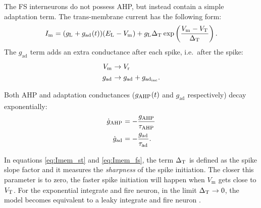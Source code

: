 \documentclass[a4paper,12pt]{article}
\newcommand{\ssc}[3]{\ensuremath{#1_{\text{#2}_{\text{#3}}}}}
\newcommand{\Vm}       {\ssc{V}      {m}     {}}
\newcommand{\Imem}     {\ssc{I}      {m}     {}}
\newcommand{\gL}       {\ssc{g}      {\scriptsize{L}}  {}}
\newcommand{\EL}       {\ssc{E}      {\scriptsize{L}}  {}}
\newcommand{\gAHP}     {\ssc{g}      {\scriptsize{AHP}}{}}
\newcommand{\tauAHP}   {\ssc{\tau}   {\scriptsize{AHP}}{}}
\newcommand{\VT}       {\ssc{V}      {\scriptsize{T}}  {}}
\newcommand{\Vr}       {\ssc{V}      {r}     {}}
\newcommand{\gad}      {\ssc{g}      {ad}{}}
\newcommand{\tauad}    {\ssc{\tau}   {ad}{}}
\newcommand{\gadinc}   {\ssc{g}      {ad}{inc}}
\newcommand{\deltaT}   {\ssc{\Delta} {\scriptsize{T}}{}}
\newcommand{\dgAHP}  {\ssc{\dot{g}}{\scriptsize{AHP}} {}}
\newcommand{\dgad}   {\ssc{\dot{g}}{\scriptsize{ad}}  {}}
\begin{document}
The FS interneurons do not possess AHP, but instead contain a simple adaptation
term. The trans-membrane current has the following form:
\begin{equation}
    \Imem = (\gL + \gad(t))(\EL-\Vm) + \gL \deltaT \exp\left(\frac{\Vm - \VT}{\deltaT}\right).
    \label{eq:Imem_fs}
\end{equation}
The $\gad$ term adds an extra conductance after each spike, i.e.\ after the
spike:
\begin{align}
    \Vm   & \rightarrow \Vr       \notag \\
    \gad  & \rightarrow \gad + \gadinc.
    \label{eq:afterspike_fs}
\end{align}

Both AHP and adaptation conductances ($\gAHP(t)$ and $\gad$ respectively) decay
exponentially:
\begin{align}
    \dgAHP   &=  -\frac{\gAHP}{\tauAHP} \notag \\
    \dgad    &=  -\frac{\gad }{\tauad}.
    \label{eq:dgAHPad}
\end{align}

In equations \eqref{eq:Imem_st} and \eqref{eq:Imem_fs}, the term $\deltaT$ is
defined as the spike slope factor \citep{FourcaudTrocme:2003wz} and it measures
the \emph{sharpness} of the spike initiation. The closer this parameter is to
zero, the faster spike initiation will happen when $\Vm$ gets close to $\VT$.
For the exponential integrate and fire neuron, in the limit $\deltaT
\rightarrow 0$, the model becomes equivalent to a leaky integrate and fire
neuron \citep{FourcaudTrocme:2003wz}.
\end{document}
